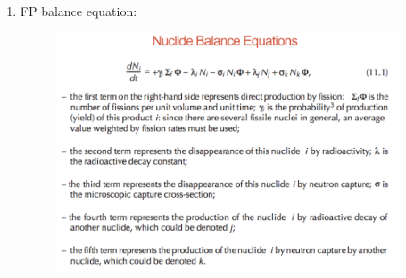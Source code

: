 \documentclass{school-22.211-notes}
\begin{document}
\begin{enumerate}
\clearpage
\item FP balance equation: 
    \begin{figure}[ht]
      \centering
      \includegraphics[width=4in]{images/dfs/nuclide-balance-equation.png}
    \end{figure}


\end{enumerate}
\end{document}
